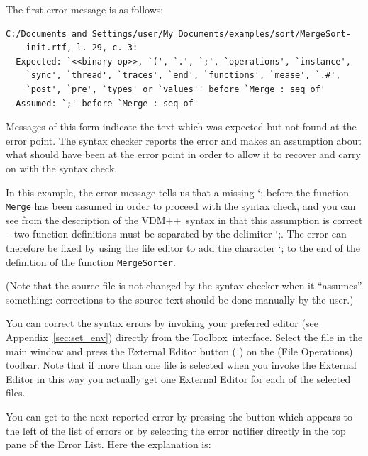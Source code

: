 \documentclass[\pformat,12pt]{article}
\newcommand{\vdmslpp}{VDM++}
\newcommand{\Toolbox}{Toolbox}
\newcommand{\Lit}[1]{`#1\Quote}
\newcommand{\aaa}{\tt }
\newcommand{\guicmd}[1]{{\sf #1}}
\begin{document}
\newpage

The first error message is as follows:

\begin{verbatim}
C:/Documents and Settings/user/My Documents/examples/sort/MergeSort-
    init.rtf, l. 29, c. 3:
  Expected: `<<binary op>>, `(', `.', `;', `operations', `instance',
    `sync', `thread', `traces', `end', `functions', `mease', `.#',
    `post', `pre', `types' or `values'' before `Merge : seq of'
  Assumed: `;' before `Merge : seq of'
\end{verbatim}

Messages of this form indicate the text which was expected but not
found at the error point. The syntax checker reports the error and
makes an assumption about what should have been at the error point in
order to allow it to recover and carry on with the syntax check.

In this example, the error message tells us that a missing \Lit{;}
before the function {\aaa Merge} has been assumed in order to proceed
with the syntax check, and you can see from the  description of the
\vdmslpp\ syntax in \cite{LangManPP-SCSK} that this assumption is correct
-- two function definitions must be separated by the delimiter
\Lit{;}. The error can therefore be fixed by using the file editor to
add the character \Lit{;} to the end of the definition of the function
{\aaa MergeSorter}.

(Note that the source file is not changed by the syntax checker when
it ``assumes'' something: corrections to the source text should be
done manually by the user.)

You can correct the syntax errors by invoking your preferred editor
(see Appendix~\ref{sec:set_env}) directly from the \Toolbox\
interface. Select the file  in the main window and 
press the \guicmd{External Editor}\index{External Editor} button (%
) 
on the (\guicmd{File Operations}) toolbar. Note that if more than
one file is selected when you invoke the \guicmd{External Editor} in
this way you actually get one \guicmd{External Editor} for each of the
selected files.

You can get to the next reported error by pressing the {\fbox{\tt >}}
button which appears to the left of the list of errors or by selecting the
error notifier directly in the top pane of the \guicmd{Error
  List}. Here the explanation is: 
\end{document}

